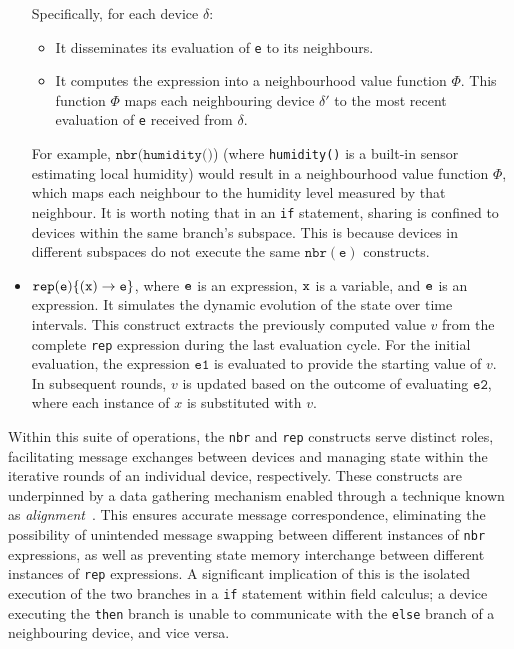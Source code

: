 \begin{itemize}
     Specifically, for each device $\delta$:
    \begin{itemize}
        \item It disseminates its evaluation of \texttt{e} to its neighbours.
        \item It computes the expression into a neighbourhood value function $\Phi$. This function $\Phi$ maps each neighbouring device $\delta'$ to the most recent evaluation of \texttt{e} received from $\delta$.
    \end{itemize}
    For example, $\texttt{nbr}(\texttt{humidity()}$) (where \texttt{humidity()} is a built-in sensor estimating local humidity) would result in a neighbourhood value function $\Phi$, 
    which maps each neighbour to the humidity level measured by that neighbour. 
    It is worth noting that in an \texttt{if} statement, 
    sharing is confined to devices within the same branch's subspace.
    This is because devices in different subspaces do not execute the same $\texttt{nbr}(\texttt{e})$ constructs.
    \item $\texttt{rep}(\texttt{e})\{(\texttt{x}) \rightarrow \texttt{e}\}$, where $\texttt{e}$ is an expression, $\texttt{x}$ is a variable, and $\texttt{e}$ is an expression. 
    It simulates the dynamic evolution of the state over time intervals. 
    This construct extracts the previously computed value \( v \) from the complete \texttt{rep} expression during the last evaluation cycle. 
    For the initial evaluation, the expression \( \texttt{e1} \) is evaluated to provide the starting value of \( v \). In subsequent rounds, 
    \( v \) is updated based on the outcome of evaluating \( \texttt{e2} \),
    where each instance of \( x \) is substituted with \( v \).

\end{itemize}
Within this suite of operations, 
 the \texttt{nbr} and \texttt{rep} constructs serve distinct roles, 
 facilitating message exchanges between devices and managing state within the iterative rounds of an individual device, respectively. 
%
These constructs are underpinned by a data gathering mechanism enabled through a technique known as \emph{alignment}~\cite{audrito2016run}. 
This ensures accurate message correspondence, 
 eliminating the possibility of unintended message swapping between different instances of \texttt{nbr} expressions, 
 as well as preventing state memory interchange between different instances of \texttt{rep} expressions. 
% 
A significant implication of this is the isolated execution of the two branches in a \texttt{if} statement within field calculus; a
  device executing the \texttt{then} branch is unable to communicate with the \texttt{else} branch of a neighbouring device, and vice versa.
%
